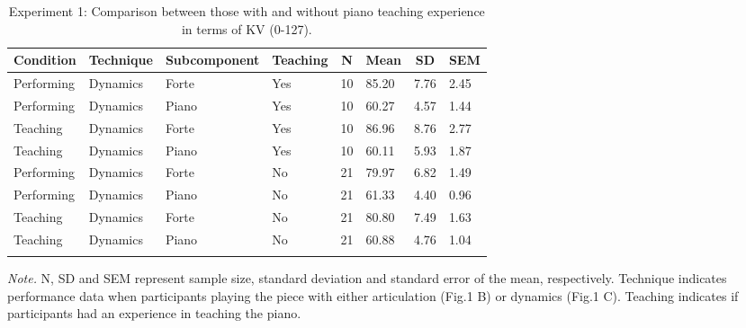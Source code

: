 \documentclass[
  man,floatsintext]{apa6}
\begin{document}
\begin{table}[tbp]

\begin{center}
\begin{threeparttable}

\caption{\label{tab:dyn-teaching-desc-1}Experiment 1: Comparison between those with and without piano teaching experience in terms of KV (0-127).}

\begin{tabular}{llllllll}
\toprule
Condition & \multicolumn{1}{c}{Technique} & \multicolumn{1}{c}{Subcomponent} & \multicolumn{1}{c}{Teaching} & \multicolumn{1}{c}{N} & \multicolumn{1}{c}{Mean} & \multicolumn{1}{c}{SD} & \multicolumn{1}{c}{SEM}\\
\midrule
Performing & Dynamics & Forte & Yes & 10 & 85.20 & 7.76 & 2.45\\
Performing & Dynamics & Piano & Yes & 10 & 60.27 & 4.57 & 1.44\\
Teaching & Dynamics & Forte & Yes & 10 & 86.96 & 8.76 & 2.77\\
Teaching & Dynamics & Piano & Yes & 10 & 60.11 & 5.93 & 1.87\\
Performing & Dynamics & Forte & No & 21 & 79.97 & 6.82 & 1.49\\
Performing & Dynamics & Piano & No & 21 & 61.33 & 4.40 & 0.96\\
Teaching & Dynamics & Forte & No & 21 & 80.80 & 7.49 & 1.63\\
Teaching & Dynamics & Piano & No & 21 & 60.88 & 4.76 & 1.04\\
\bottomrule
\addlinespace
\end{tabular}

\begin{tablenotes}[para]
\normalsize{\textit{Note.} N, SD and SEM represent sample size, standard deviation and standard error of the mean, respectively. Technique indicates performance data when participants playing the piece with either articulation (Fig.1 B) or dynamics (Fig.1 C). Teaching indicates if participants had an experience in teaching the piano.}
\end{tablenotes}

\end{threeparttable}
\end{center}

\end{table}
\end{document}
